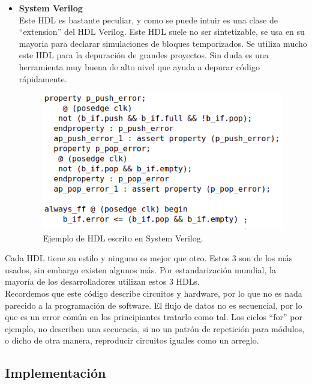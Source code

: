 \documentclass[twoside,spanish,ESP,MSc]{plantillaLabUPV}
\theoremstyle{definition}
\begin{document}
\begin{itemize}
\item \textbf{System Verilog}\\
Este HDL es bastante peculiar, y como se puede intuir es una clase de ``extension'' del HDL Verilog. Este HDL suele no ser sintetizable, se usa en su mayoria para declarar simulaciones de bloques temporizados. Se utiliza mucho este HDL para la depuración de grandes proyectos. Sin duda es una herramienta muy buena de alto nivel que ayuda a depurar código rápidamente.\\

\begin{figure}[h]
\centering
\includegraphics[scale=0.5]{ima/sv.png}
\caption{Ejemplo de HDL escrito en System Verilog.%
\label{sveri}}
\end{figure}

\end{itemize}


Cada HDL tiene su estilo y ninguno es mejor que otro. Estos 3 son de los más usados, sin embargo existen algunos más. Por estandarización mundial, la mayoría de los desarrolladores utilizan estos 3 HDLs.\\

Recordemos que este código describe circuitos y hardware, por lo que no es nada parecido a la programación de software. El flujo de datos no es secuencial, por lo que es un error común en los principiantes tratarlo como tal. Los ciclos ``for'' por ejemplo, no describen una secuencia, si no un patrón de repetición para módulos, o dicho de otra manera, reproducir circuitos iguales como un arreglo.

\subsection{Implementación}%
\end{document}

